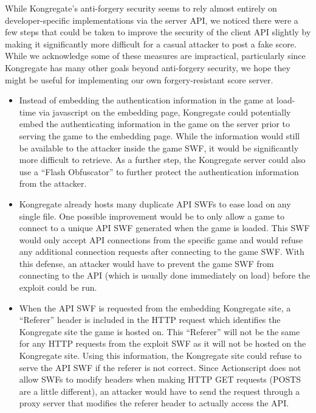 \documentclass [11pt] {article}
\begin{document}
While Kongregate's anti-forgery security seems to rely almost entirely on developer-specific implementations via the server API, we noticed there were a few steps that could be taken to improve the security of the client API slightly by making it significantly more difficult for a casual attacker to post a fake score. While we acknowledge some of these measures are impractical, particularly since Kongregate has many other goals beyond anti-forgery security, we hope they might be useful for implementing our own forgery-resistant score server.  

\begin {itemize} 

\item Instead of embedding the authentication information in the game at load-time via javascript on the embedding page, Kongregate could potentially embed the authenticating information in the game on the server prior to serving the game to the embedding page. While the information would still be available to the attacker inside the game SWF, it would be significantly more difficult to retrieve. As a further step, the Kongregate server could also use a ``Flash Obfuscator'' to further protect the authentication information from the attacker.

\item Kongregate already hosts many duplicate API SWFs to ease load on any single file. One possible improvement would be to only allow a game to connect to a unique API SWF generated when the game is loaded. This SWF would only accept API connections from the specific game and would refuse any additional connection requests after connecting to the game SWF. With this defense, an attacker would have to prevent the game SWF from connecting to the API (which is usually done immediately on load) before the exploit could be run. 

\item When the API SWF is requested from the embedding Kongregate site, a ``Referer'' header is included in the HTTP request which identifies the Kongregate site the game is hosted on. This ``Referer'' will not be the same for any HTTP requests from the exploit SWF as it will not be hosted on the Kongregate site. Using this information, the Kongregate site could refuse to serve the API SWF if the referer is not correct. Since Actionscript does not allow SWFs to modify headers when making HTTP GET requests (POSTS are a little different), an attacker would have to send the request through a proxy server that modifies the referer header to actually access the API. 

\end {itemize}  
\end{document}
